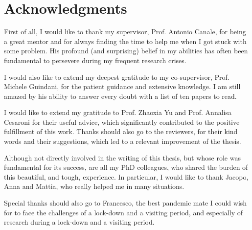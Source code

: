 \chapter*{Acknowledgments} 

First of all, I would like to thank my supervisor, Prof. Antonio Canale, for being a great mentor and for always finding the time to help me when I got stuck with some problem. His profound (and surprising) belief in my abilities has often been fundamental to persevere during my frequent research crises.

I would also like to extend my deepest gratitude to my co-supervisor, Prof. Michele Guindani, for the patient guidance and extensive knowledge. I am still amazed by his ability to answer every doubt with a list of ten papers to read.

I would like to extend my gratitude to Prof. Zhaoxia Yu and Prof. Annalisa Cesaroni for their useful advice, which significantly contributed to the positive fulfillment of this work. Thanks should also go to the reviewers, for their kind words and their suggestions, which led to a relevant improvement of the thesis.

Although not directly involved in the writing of this thesis, but whose role was fundamental for its success, are all my PhD colleagues, who shared the burden of this beautiful, and tough, experience. In particular, I would like to thank Jacopo, Anna and Mattia, who really helped me in many situations.

Special thanks should also go to Francesco, the best pandemic mate I could wish for to face the challenges of a lock-down and a visiting period, and especially of research during a lock-down and a visiting period.
